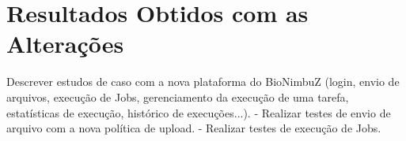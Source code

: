 
\chapter{Resultados Obtidos com as Alterações} \label{cap5}

Descrever estudos de caso com a nova plataforma do BioNimbuZ (login, envio de arquivos, execução de Jobs, gerenciamento da execução de uma tarefa, estatísticas de execução, histórico de execuções...).
-	Realizar testes de envio de arquivo com a nova política de upload.
-	Realizar testes de execução de Jobs.


